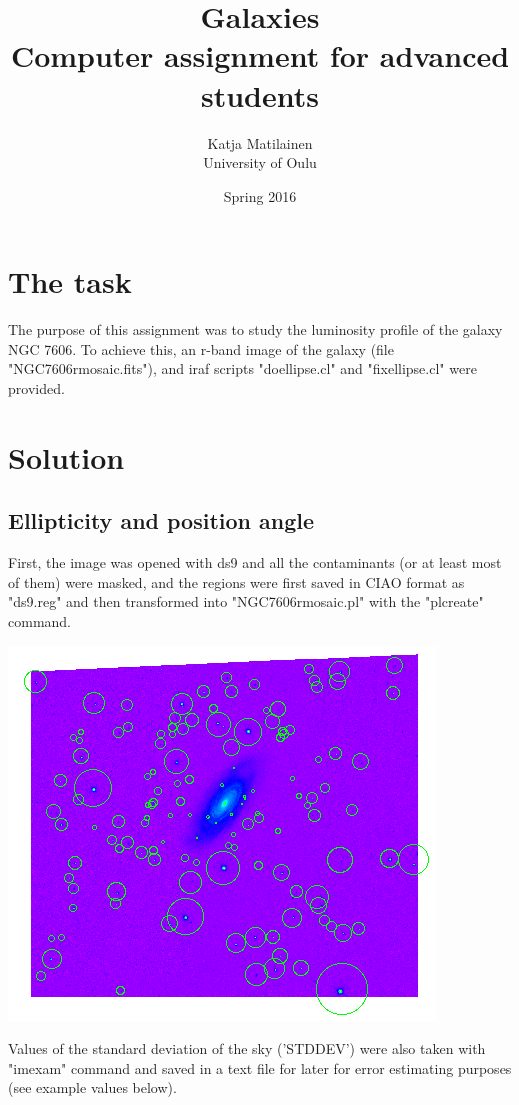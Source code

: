 \documentclass[a4paper,12pt]{article}
\author{Katja Matilainen \\ University of Oulu}
\title{Galaxies \\ Computer assignment for advanced students}
\date{Spring 2016}
\begin{document}
\begin{tiny}
\maketitle
\end{tiny}

\section{The task}
The purpose of this assignment was to study the luminosity profile of the galaxy NGC 7606. To achieve this, an r-band image of the galaxy (file "NGC7606rmosaic.fits"), and iraf scripts "doellipse.cl" and "fixellipse.cl" were provided.

\section{Solution}

\subsection{Ellipticity and position angle}

First, the image was opened with ds9 and all the contaminants (or at least most of them) were masked, and the regions were first saved in CIAO format as "ds9.reg" and then transformed into "NGC7606rmosaic.pl" with the "plcreate" command.

\centerline{\includegraphics[scale=0.6]{NGC7606.png}}%

Values of the standard deviation of the sky ('STDDEV') were also taken with "imexam" command and saved in a text file for later for error estimating purposes (see example values below).
\end{document}
